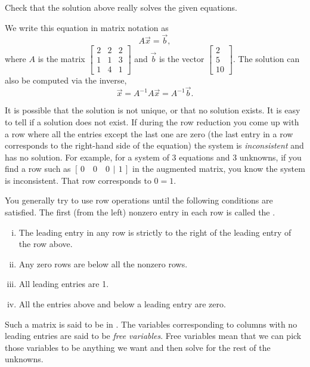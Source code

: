 \begin{exercise}
Check that the solution above really solves the given equations.
\end{exercise}

We write this equation in matrix notation as
\begin{equation*}
A \vec{x} = \vec{b} ,
\end{equation*}
where $A$ is the matrix
$\left[ \begin{smallmatrix}
2 & 2 & 2 \\
1 & 1 & 3 \\
1 & 4 & 1 
\end{smallmatrix} \right]$ and $\vec{b}$ is the vector
$\left[ \begin{smallmatrix}
2 \\
5 \\
10
\end{smallmatrix} \right]$.  The solution can also be computed via the
inverse,
\begin{equation*}
\vec{x} = A^{-1} A \vec{x} = A^{-1} \vec{b} .
\end{equation*}

\medskip

It is
possible that the solution is not unique, or that no solution exists.
It is easy to tell if a solution does not exist.  If during the row
reduction you come up with a row where all the entries except the last one
are zero (the last entry in a row corresponds to the right-hand side of the
equation) the system is \emph{inconsistent} and
has no solution.  For
example, for a system of 3 equations and 3 unknowns, if you find a row
such as $[\,0 \quad 0 \quad 0 ~\,|\,~ 1\,]$ in the augmented matrix,
you know the system is inconsistent.  That row corresponds to $0=1$.

\medskip

You generally try to use row operations until the following conditions
are satisfied.  The first (from the left) nonzero entry in each row is called the
\emph{}.
\begin{enumerate}[(i)]
\item The leading entry in any row is strictly to the right of
the leading entry of the row above.
\item Any zero rows are below all the nonzero rows.
\item All leading entries are 1.
\item All the entries above and below a leading entry are zero.
\end{enumerate}
Such a matrix is said to be in
\emph{}.  The variables
corresponding to columns with no leading entries are said to be
\emph{free variables}.
Free variables mean that we can pick those variables
to be anything we want and then solve for the rest of the unknowns.

